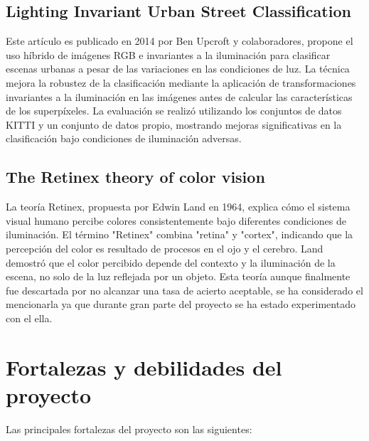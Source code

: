 \subsection{Lighting Invariant Urban Street Classification}\label{upcroft-1}

Este artículo es publicado en 2014 por Ben Upcroft y colaboradores, propone el uso híbrido de imágenes RGB e invariantes a la iluminación para clasificar escenas urbanas a pesar de las variaciones en las condiciones de luz. La técnica mejora la robustez de la clasificación mediante la aplicación de transformaciones invariantes a la iluminación en las imágenes antes de calcular las características de los superpíxeles. La evaluación se realizó utilizando los conjuntos de datos KITTI y un conjunto de datos propio, mostrando mejoras significativas en la clasificación bajo condiciones de iluminación adversas.

\subsection{The Retinex theory of color vision}\label{retinex-1}

La teoría Retinex, propuesta por Edwin Land en 1964, explica cómo el sistema visual humano percibe colores consistentemente bajo diferentes condiciones de iluminación. El término "Retinex" combina "retina" y "cortex", indicando que la percepción del color es resultado de procesos en el ojo y el cerebro. Land demostró que el color percibido depende del contexto y la iluminación de la escena, no solo de la luz reflejada por un objeto. Esta teoría aunque finalmente fue descartada por no alcanzar una tasa de acierto aceptable, se ha considerado el mencionarla ya que durante gran parte del proyecto se ha estado experimentado con el ella.


\section{Fortalezas y debilidades del proyecto}\label{fortalezas-y-debilidades-del-proyecto}

Las principales fortalezas del proyecto son las siguientes:

